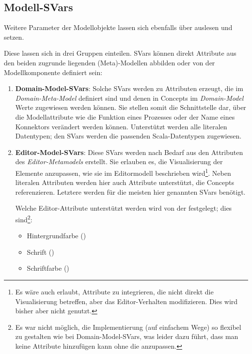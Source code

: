 \documentclass[a4paper,10pt]{sphinxmanual}
\begin{document}
\subsection{Modell-SVars}
\label{modellanbindung:modellanbindung-svars}\label{modellanbindung:modell-svars}
Weitere Parameter der Modellobjekte lassen sich ebenfalls über  auslesen und setzen.

Diese  lassen sich in drei Gruppen einteilen.
SVars können direkt Attribute aus den beiden zugrunde liegenden (Meta)-Modellen abbilden oder von der Modellkomponente definiert sein:
\begin{enumerate}
\item {} 
\textbf{Domain-Model-SVars}:
Solche SVars werden zu Attributen erzeugt, die im \emph{Domain-Meta-Model} definiert sind und denen in Concepts im \emph{Domain-Model} Werte zugewiesen werden können.
Sie stellen somit die Schnittstelle dar, über die Modellattribute wie die Funktion eines Prozesses oder der Name eines Konnektors verändert werden können.
Unterstützt werden alle literalen Datentypen; den SVars werden die passenden Scala-Datentypen zugewiesen.

\item {} 
\textbf{Editor-Model-SVars}:
Diese SVars werden nach Bedarf aus den Attributen des \emph{Editor-Metamodels} erstellt.
Sie erlauben es, die Visualisierung der Elemente anzupassen, wie sie im Editormodell beschrieben wird\footnote{
Es wäre auch erlaubt, Attribute zu integrieren, die nicht direkt die Visualisierung betreffen, aber das Editor-Verhalten modifizieren. Dies wird bisher aber nicht genutzt.
}.
Neben literalen Attributen werden hier auch Attribute unterstützt, die Concepts referenzieren. Letztere werden für die meisten hier genannten SVars benötigt.

Welche Editor-Attribute unterstützt werden wird von der  festgelegt; dies sind\footnote{
Es war nicht möglich, die Implementierung (auf einfachem Wege) so flexibel zu gestalten wie bei Domain-Model-SVars, was leider dazu führt, dass man keine Attribute hinzufügen kann ohne die  anzupassen.
}:
\begin{itemize}
\item {} 
Hintergrundfarbe ()

\item {} 
Schrift ()

\item {} 
Schriftfarbe ()


\end{itemize}
\end{enumerate}
\end{document}
